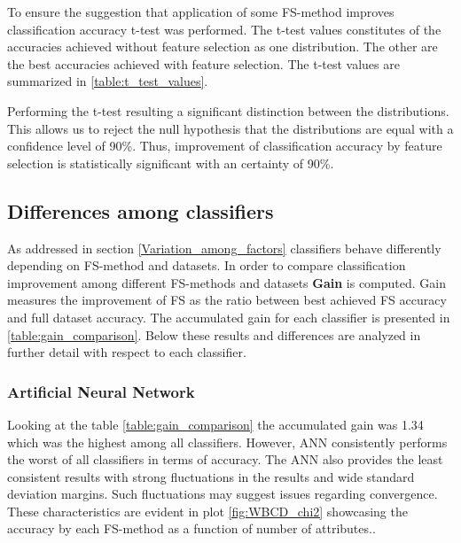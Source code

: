 To ensure the suggestion that application of some FS-method improves classification accuracy t-test was performed. The t-test values constitutes of the accuracies achieved without feature selection as one distribution. The other are the best accuracies achieved with feature selection. The t-test values are summarized in \ref{table:t_test_values}.




Performing the t-test resulting a significant distinction between the distributions. This allows us to reject the null hypothesis that the distributions are equal with a confidence level of 90\%. Thus, improvement of classification accuracy by feature selection is statistically significant with an certainty of 90\%.

\subsection{Differences among classifiers}

As addressed in section \ref{Variation_among_factors} classifiers behave differently depending on FS-method and datasets.
In order to compare classification improvement among different FS-methods and datasets \textbf{Gain} is computed. Gain measures the improvement of FS as the ratio between best achieved FS accuracy and full dataset accuracy. The accumulated gain for each classifier is presented in \ref{table:gain_comparison}. Below these results and differences are analyzed in further detail with respect to each classifier.

\begin{table}[hp]
  
  \caption[]%
  {{\small Ranking of which classifiers gained most accuracy when comparing feature selection to full dataset.}}
  \label{table:gain_comparison}
\end{table}

\subsubsection{Artificial Neural Network}

Looking at the table \ref{table:gain_comparison} the accumulated gain was 1.34 which was the highest among all classifiers. However, ANN consistently performs the worst of all classifiers in terms of accuracy. The ANN also provides the least consistent results with strong fluctuations in the results and wide standard deviation margins. Such fluctuations may suggest issues regarding convergence. These characteristics are evident in plot \ref{fig:WBCD_chi2} showcasing the accuracy by each FS-method as a function of number of attributes..

